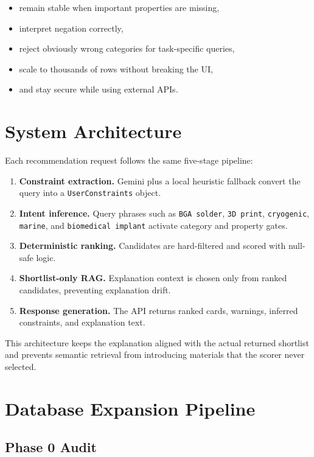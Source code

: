 \documentclass[11pt,a4paper]{article}
\begin{document}
\begin{itemize}[leftmargin=*]
  \item remain stable when important properties are missing,
  \item interpret negation correctly,
  \item reject obviously wrong categories for task-specific queries,
  \item scale to thousands of rows without breaking the UI,
  \item and stay secure while using external APIs.
\end{itemize}

\section{System Architecture}

Each recommendation request follows the same five-stage pipeline:

\begin{enumerate}[leftmargin=*]
  \item \textbf{Constraint extraction.} Gemini plus a local heuristic fallback convert the query into a \texttt{UserConstraints} object.
  \item \textbf{Intent inference.} Query phrases such as \texttt{BGA solder}, \texttt{3D print}, \texttt{cryogenic}, \texttt{marine}, and \texttt{biomedical implant} activate category and property gates.
  \item \textbf{Deterministic ranking.} Candidates are hard-filtered and scored with null-safe logic.
  \item \textbf{Shortlist-only RAG.} Explanation context is chosen only from ranked candidates, preventing explanation drift.
  \item \textbf{Response generation.} The API returns ranked cards, warnings, inferred constraints, and explanation text.
\end{enumerate}

This architecture keeps the explanation aligned with the actual returned shortlist and prevents semantic retrieval from introducing materials that the scorer never selected.

\section{Database Expansion Pipeline}

\subsection{Phase 0 Audit}
\end{document}
